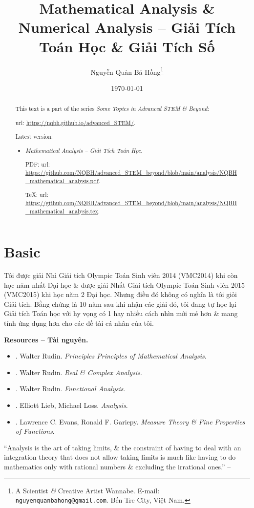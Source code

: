 \documentclass{article}
\title{Mathematical Analysis \& Numerical Analysis -- Giải Tích Toán Học \& Giải Tích Số}
\author{Nguyễn Quản Bá Hồng\footnote{A Scientist {\it\&} Creative Artist Wannabe. E-mail: {\tt nguyenquanbahong@gmail.com}. Bến Tre City, Việt Nam.}}
\date{\today}
\begin{document}
\maketitle
\begin{abstract}
	This text is a part of the series {\it Some Topics in Advanced STEM \& Beyond}:
	
	{\sc url}: \url{https://nqbh.github.io/advanced_STEM/}.
	
	Latest version:
	\begin{itemize}
		\item {\it Mathematical Analysis -- Giải Tích Toán Học}.
		
		PDF: {\sc url}: \url{https://github.com/NQBH/advanced_STEM_beyond/blob/main/analysis/NQBH_mathematical_analysis.pdf}.
		
		\TeX: {\sc url}: \url{https://github.com/NQBH/advanced_STEM_beyond/blob/main/analysis/NQBH_mathematical_analysis.tex}.
	\end{itemize}
\end{abstract}
\tableofcontents


\section{Basic}
Tôi được giải Nhì Giải tích Olympic Toán Sinh viên 2014 (VMC2014) khi còn học năm nhất Đại học \& được giải Nhất Giải tích Olympic Toán Sinh viên 2015 (VMC2015) khi học năm 2 Đại học. Nhưng điều đó không có nghĩa là tôi giỏi Giải tích. Bằng chứng là 10 năm sau khi nhận các giải đó, tôi đang tự học lại Giải tích Toán học với hy vọng có 1 hay nhiều cách nhìn mới mẻ hơn \& mang tính ứng dụng hơn cho các đề tài cá nhân của tôi.

\noindent\textbf{\textsf{Resources -- Tài nguyên.}}
\begin{itemize}
	\item \cite{Rudin1976}. {\sc Walter Rudin}. {\it Principles Principles of Mathematical Analysis}.
	\item \cite{Rudin1973,Rudin1987}. {\sc Walter Rudin}. {\it Real \& Complex Analysis}.
	\item \cite{Rudin1991}. {\sc Walter Rudin}. {\it Functional Analysis}.
	\item \cite{Lieb_Loss2001}. {\sc Elliott Lieb, Michael Loss}. {\it Analysis}.
	\item \cite{Evans_Gariepy2015}. {\sc Lawrence C. Evans, Ronald F. Gariepy}. {\it Measure Theory \& Fine Properties of Functions}.
\end{itemize}
``Analysis is the art of taking limits, \& the constraint of having to deal with an integration theory that does not allow taking limits is much like having to do mathematics only with rational numbers \& excluding the irrational ones.'' -- \cite[Chap. 1, p. 1]{Lieb_Loss2001}
\end{document}
